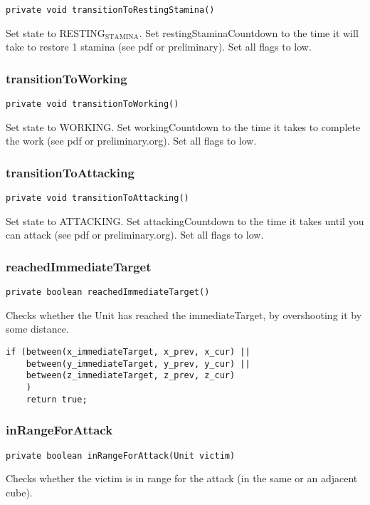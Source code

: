 \documentclass[11pt]{article}
\begin{document}
\begin{verbatim}
private void transitionToRestingStamina()
\end{verbatim}

Set state to RESTING$_{\text{STAMINA}}$. Set restingStaminaCountdown to the time it will
take to restore 1 stamina (see pdf or preliminary). Set all flags to low.


\subsubsection{transitionToWorking}
\label{sec-7-3-5}

\begin{verbatim}
private void transitionToWorking()
\end{verbatim}

Set state to WORKING. Set workingCountdown to the time it takes to complete the
work (see pdf or preliminary.org). Set all flags to low.


\subsubsection{transitionToAttacking}
\label{sec-7-3-6}

\begin{verbatim}
private void transitionToAttacking()
\end{verbatim}

Set state to ATTACKING. Set attackingCountdown to the time it takes until you
can attack (see pdf or preliminary.org). Set all flags to low.


\subsubsection{reachedImmediateTarget}
\label{sec-7-3-7}

\begin{verbatim}
private boolean reachedImmediateTarget()
\end{verbatim}

Checks whether the Unit has reached the immediateTarget, by overshooting it by
some distance.

\begin{verbatim}
if (between(x_immediateTarget, x_prev, x_cur) ||
    between(y_immediateTarget, y_prev, y_cur) ||
    between(z_immediateTarget, z_prev, z_cur)
    )
    return true;
\end{verbatim}


\subsubsection{inRangeForAttack}
\label{sec-7-3-8}

\begin{verbatim}
private boolean inRangeForAttack(Unit victim)
\end{verbatim}

Checks whether the victim is in range for the attack (in the same or an adjacent
cube).
\end{document}
